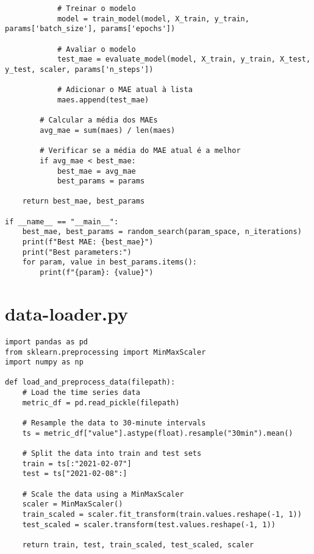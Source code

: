 \begin{lstlisting}
            # Treinar o modelo
            model = train_model(model, X_train, y_train, params['batch_size'], params['epochs'])
            
            # Avaliar o modelo
            test_mae = evaluate_model(model, X_train, y_train, X_test, y_test, scaler, params['n_steps'])

            # Adicionar o MAE atual à lista
            maes.append(test_mae)

        # Calcular a média dos MAEs
        avg_mae = sum(maes) / len(maes)

        # Verificar se a média do MAE atual é a melhor
        if avg_mae < best_mae:
            best_mae = avg_mae
            best_params = params

    return best_mae, best_params

if __name__ == "__main__":
    best_mae, best_params = random_search(param_space, n_iterations)
    print(f"Best MAE: {best_mae}")
    print("Best parameters:")
    for param, value in best_params.items():
        print(f"{param}: {value}")

\end{lstlisting}

\section{data-loader.py}
\begin{lstlisting}
import pandas as pd
from sklearn.preprocessing import MinMaxScaler
import numpy as np

def load_and_preprocess_data(filepath):
    # Load the time series data
    metric_df = pd.read_pickle(filepath)

    # Resample the data to 30-minute intervals
    ts = metric_df["value"].astype(float).resample("30min").mean()

    # Split the data into train and test sets
    train = ts[:"2021-02-07"]
    test = ts["2021-02-08":]

    # Scale the data using a MinMaxScaler
    scaler = MinMaxScaler()
    train_scaled = scaler.fit_transform(train.values.reshape(-1, 1))
    test_scaled = scaler.transform(test.values.reshape(-1, 1))

    return train, test, train_scaled, test_scaled, scaler
\end{lstlisting}

